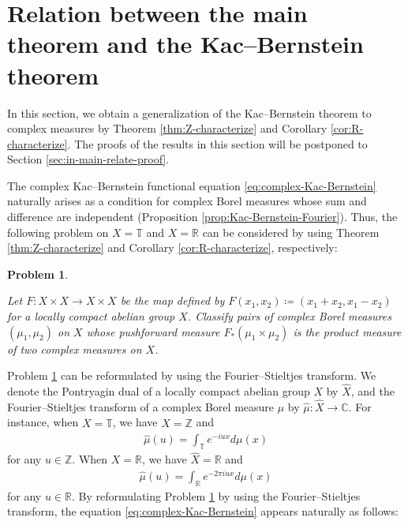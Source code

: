 \documentclass[12pt]{article}
\newtheorem{problem}[theorem]{Problem}
\theoremstyle{definition}
\theoremstyle{remark}
\numberwithin{equation}{section}
\numberwithin{figure}{section}
\numberwithin{table}{section}
\begin{document}
\section{Relation between the main theorem and the Kac--Bernstein theorem}
\label{sec:main-relate}

In this section, we obtain a generalization of the Kac--Bernstein theorem to complex measures by Theorem \ref{thm:Z-characterize} and Corollary \ref{cor:R-characterize}.
The proofs of the results in this section will be postponed to Section \ref{sec:in-main-relate-proof}.

The complex Kac--Bernstein functional equation \eqref{eq:complex-Kac-Bernstein} naturally arises as a condition for complex Borel measures whose sum and difference are independent (Proposition \ref{prop:Kac-Bernstein-Fourier}).
Thus, the following problem on $ X = \mathbb{ T } $ and $ X = \mathbb{ R } $ can be considered by using Theorem \ref{thm:Z-characterize} and Corollary \ref{cor:R-characterize}, respectively:

\begin{problem}
  \label{Q:Kac-Bernstein-complex}

Let $ F \colon X \times X \to X \times X $ be the map defined by $ F ( x_1 , x_2 ) \coloneqq ( x_1 + x_2 , x_1 - x_2 ) $ for a locally compact abelian group $ X $.
Classify pairs of complex Borel measures $ ( \mu_1 , \mu_2 ) $ on $ X $ whose pushforward measure $ F_* ( \mu_1 \times \mu_2 ) $ is the product measure of two complex measures on $ X $.
\end{problem}

Problem \ref{Q:Kac-Bernstein-complex} can be reformulated by using the Fourier--Stieltjes transform.
We denote the Pontryagin dual of a locally compact abelian group $ X $ by $ \hat{ X } $, and the Fourier--Stieltjes transform of a complex Borel measure $ \mu $ by $ \hat{ \mu } \colon \hat{ X } \to \mathbb{ C } $.
For instance, when $ X = \mathbb{ T } $, we have $ \hat{ X } = \mathbb{ Z } $ and
\begin{align}
    \hat{ \mu } ( u ) = \int_{ \mathbb{ T } } e^{ - i u x } d \mu ( x )
\end{align}
for any $ u \in \mathbb{ Z } $.
When $ X = \mathbb{ R } $, we have $ \hat{ X } = \mathbb{ R } $ and 
\begin{align}
    \hat{ \mu } ( u ) = \int_{ \mathbb{ R } } e^{ - 2 \pi i u x } d \mu ( x )
\end{align}
for any $ u \in \mathbb{ R } $.
By reformulating Problem \ref{Q:Kac-Bernstein-complex} by using the Fourier--Stieltjes transform, the equation \eqref{eq:complex-Kac-Bernstein} appears naturally as follows:
\end{document}
